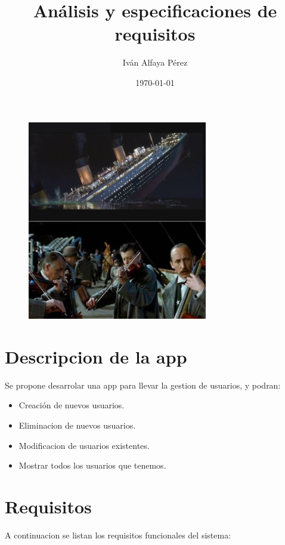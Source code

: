 \documentclass{article}
\title{Análisis y especificaciones de requisitos}
\author{Iván Alfaya Pérez}
\date{\today}
\begin{document}
\maketitle

\begin{figure}[h!]
    \centering
    \includegraphics[width=0.7\textwidth]{img1.jpg}
\end{figure}

\clearpage 

\tableofcontents %
\clearpage 

\section{Descripcion de la app}
Se propone desarrolar una app para llevar la gestion de usuarios, y podran:
\begin{itemize}
    \item Creación de nuevos usuarios. 
    \item Eliminacion de nuevos usuarios.
    \item Modificacion de usuarios existentes.
    \item Mostrar todos los usuarios que tenemos.
    
\end{itemize}

\section{Requisitos}
A continuacion se listan los requisitos funcionales del sistema:
\end{document}
